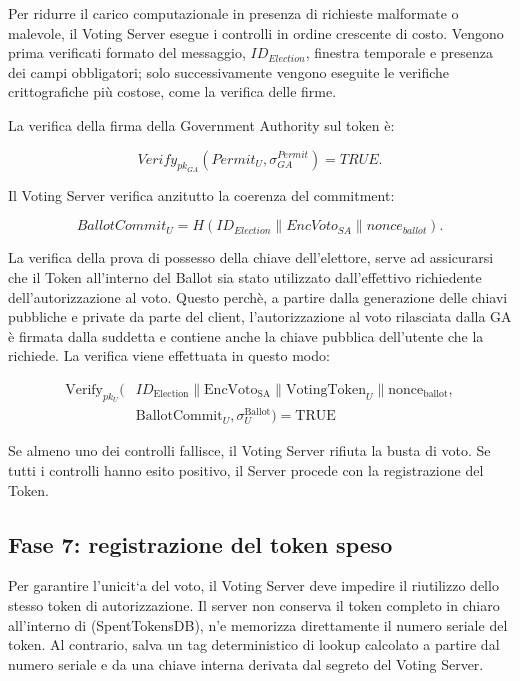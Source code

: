 \documentclass[a4paper,12pt]{article}
\begin{document}
Per ridurre il carico computazionale in presenza di richieste malformate o malevole, il Voting Server esegue i controlli in ordine crescente di costo.
Vengono prima verificati formato del messaggio, \(ID_{Election}\), finestra temporale e presenza dei campi obbligatori; solo successivamente vengono eseguite le verifiche crittografiche pi\`u costose, come la verifica delle firme.

La verifica della firma della Government Authority sul token \`e:

\[
	Verify_{pk_{GA}}(Permit_U, \sigma_{GA}^{Permit}) = TRUE.
\]

Il Voting Server verifica anzitutto la coerenza del commitment:

\[
	BallotCommit_U =
	H(ID_{Election} \parallel EncVoto_{SA} \parallel nonce_{ballot}).
\]

La verifica della prova di possesso della chiave dell'elettore, serve ad assicurarsi che il Token all'interno
del Ballot sia stato utilizzato dall'effettivo richiedente dell'autorizzazione al voto. Questo perchè, a partire dalla generazione
delle chiavi pubbliche e private da parte del client, l'autorizzazione al voto rilasciata dalla GA è firmata dalla suddetta e contiene
anche la chiave pubblica dell'utente che la richiede. La verifica viene effettuata in questo modo:

\begin{equation}
\begin{split}
	\text{Verify}_{pk_U}\Big( & ID_{\text{Election}} \parallel \text{EncVoto}_{\text{SA}} \parallel \text{VotingToken}_U \parallel \text{nonce}_{\text{ballot}}, \\
	& \text{BallotCommit}_U, \sigma_U^{\text{Ballot}} \Big) = \text{TRUE}
\end{split}
\end{equation}

Se almeno uno dei controlli fallisce, il Voting Server rifiuta la busta di voto. 
Se tutti i controlli hanno esito positivo, il Server procede con la registrazione del Token. 
\subsection{Fase 7: registrazione del token speso}

Per garantire l'unicit`a del voto, il Voting Server deve impedire il riutilizzo dello stesso token di autorizzazione.
Il server non conserva il token completo in chiaro all'interno di (SpentTokensDB), n'e memorizza direttamente il numero seriale del token.
Al contrario, salva un tag deterministico di lookup calcolato a partire dal numero seriale e da una chiave interna derivata dal segreto del Voting Server.
\end{document}
